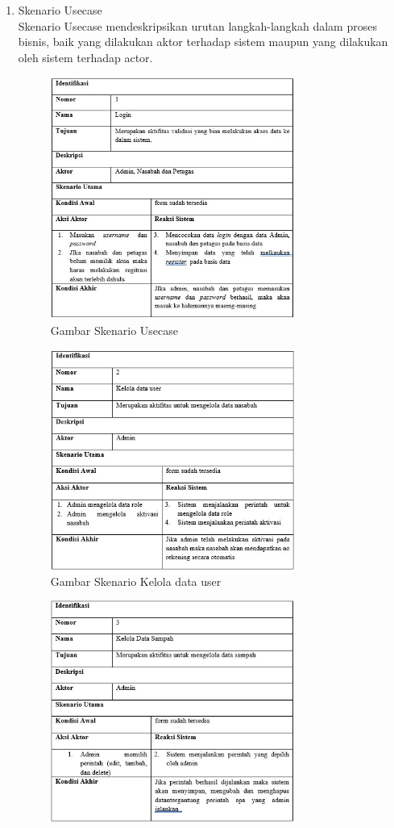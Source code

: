 \begin{enumerate}
\item Skenario Usecase 
\hfill\\
Skenario Usecase mendeskripsikan urutan langkah-langkah dalam proses bisnis, baik yang dilakukan aktor terhadap sistem maupun yang dilakukan oleh sistem terhadap actor.
	\begin{figure}[H]
		\includegraphics[width=8cm]{figures/analisis/a3.jpg}
		\centering
		\caption{Gambar Skenario Usecase}
	\end{figure}
	\begin{figure}[H]
		\includegraphics[width=8cm]{figures/analisis/a4.jpg}
		\centering
		\caption{Gambar Skenario Kelola data user}
	\end{figure}
	\begin{figure}[H]
		\includegraphics[width=8cm]{figures/analisis/a5.jpg}

\end{figure}
\end{enumerate}

